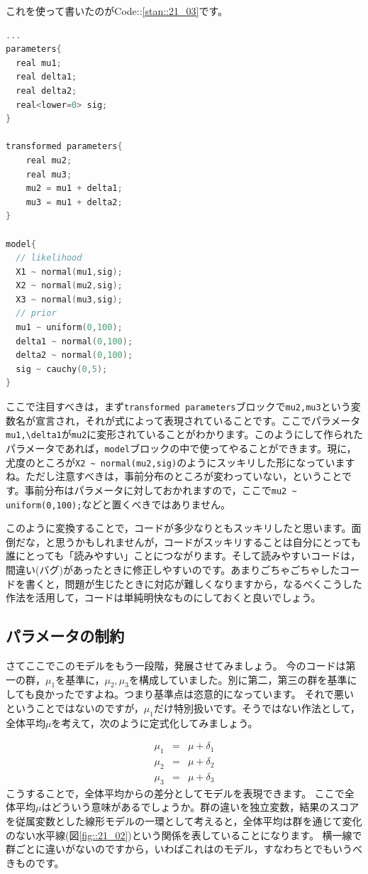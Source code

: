 \documentclass{ltjsbook}
\begin{document}
これを使って書いたのがCode::\ref{stan::21_03}です。
\begin{lstlisting}[language=C++,label={stan::21_03},caption={パラメータ変換を入れたコード}]
...
parameters{
  real mu1;
  real delta1;
  real delta2;
  real<lower=0> sig;
}

transformed parameters{
    real mu2;
    real mu3;
    mu2 = mu1 + delta1;
    mu3 = mu1 + delta2;
}

model{
  // likelihood
  X1 ~ normal(mu1,sig);
  X2 ~ normal(mu2,sig);
  X3 ~ normal(mu3,sig);
  // prior
  mu1 ~ uniform(0,100);
  delta1 ~ normal(0,100);
  delta2 ~ normal(0,100);
  sig ~ cauchy(0,5);
}

\end{lstlisting}
ここで注目すべきは，まず\verb|transformed parameters|ブロックで\verb|mu2,mu3|という変数名が宣言され，それが式によって表現されていることです。ここでパラメータ\verb|mu1,\delta1|が\verb|mu2|に変形されていることがわかります。このようにして作られたパラメータであれば，\verb|model|ブロックの中で使ってやることができます。現に，尤度のところが\verb|X2 ~ normal(mu2,sig)|のようにスッキリした形になっていますね。ただし注意すべきは，事前分布のところが変わっていない，ということです。事前分布はパラメータに対しておかれますので，ここで\verb|mu2 ~ uniform(0,100);|などと置くべきではありません。

このように変換することで，コードが多少なりともスッキリしたと思います。面倒だな，と思うかもしれませんが，コードがスッキリすることは自分にとっても誰にとっても「読みやすい」ことにつながります。そして読みやすいコードは，間違い(バグ)があったときに修正しやすいのです。あまりごちゃごちゃしたコードを書くと，問題が生じたときに対応が難しくなりますから，なるべくこうした作法を活用して，コードは単純明快なものにしておくと良いでしょう。
\subsection{パラメータの制約}
さてここでこのモデルをもう一段階，発展させてみましょう。
今のコードは第一の群，$\mu_1$を基準に，$\mu_2,\mu_3$を構成していました。別に第二，第三の群を基準にしても良かったですよね。つまり基準点は恣意的になっています。
それで悪いということではないのですが，$\mu_1$だけ特別扱いです。そうではない作法として，全体平均$\mu$を考えて，次のように定式化してみましょう。

\begin{eqnarray}
  \mu_1 &=& \mu + \delta_1 \\
  \mu_2 &=& \mu + \delta_2 \\
  \mu_3 &=& \mu + \delta_3
\end{eqnarray}
こうすることで，全体平均からの差分としてモデルを表現できます。
ここで全体平均$\mu$はどういう意味があるでしょうか。群の違いを独立変数，結果のスコアを従属変数とした線形モデルの一環として考えると，全体平均は群を通じて変化のない水平線(図\ref{fig::21_02})という関係を表していることになります。
横一線で群ごとに違いがないのですから，いわばこれはのモデル，すなわちとでもいうべきものです。
\end{document}
